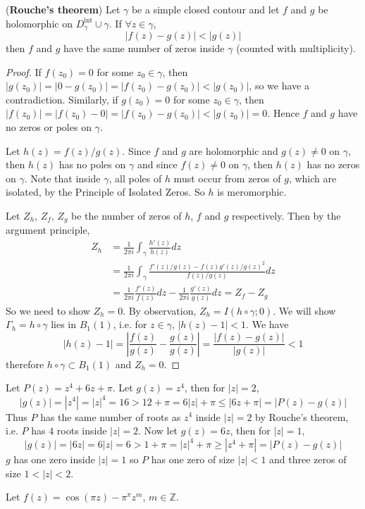 \begin{theorem}
	(\textbf{Rouche's theorem}) Let $\gamma$ be a simple closed contour and let $f$ and $g$ be holomorphic on $D_{\gamma}^{\text{int}} \cup \gamma$. If $\forall z \in \gamma$,
	\[
		|f(z) - g(z)| < |g(z)|
	\]
	then $f$ and $g$ have the same number of zeros inside $\gamma$ (counted with multiplicity).
\end{theorem}

\begin{proof}
	If $f(z_0) = 0$ for some $z_0 \in \gamma$, then $|g(z_0)| = |0 - g(z_0)| = |f(z_0) - g(z_0)| < |g(z_0)|$, so we have a contradiction. Similarly, if $g(z_0) = 0$ for some $z_0 \in \gamma$, then $|f(z_0)| = |f(z_0) - 0| = |f(z_0) - g(z_0)| < |g(z_0)| = 0$. Hence $f$ and $g$ have no zeros or poles on $\gamma$.

	Let $h(z) = f(z) / g(z)$. Since $f$ and $g$ are holomorphic and $g(z) \ne 0$ on $\gamma$, then $h(z)$ has no poles on $\gamma$ and since $f(z) \ne 0$ on $\gamma$, then $h(z)$ has no zeros on $\gamma$. Note that inside $\gamma$, all poles of $h$ must occur from zeros of $g$, which are isolated, by the Principle of Isolated Zeros. So $h$ is meromorphic.

	Let $Z_h$, $Z_f$, $Z_g$ be the number of zeros of $h$, $f$ and $g$ respectively. Then by the argument principle,
	\[
		\begin{aligned}
			Z_h & = \frac{1}{2\pi i} \int_{\gamma} \frac{h'(z)}{h(z)} dz \\
			& = \frac{1}{2\pi i} \int_{\gamma} \frac{f'(z) / g(z) - f(z) g'(z) / g(z)^2}{f(z) / g(z)} dz \\
			& = \frac{1}{2 \pi i} \frac{f'(z)}{f(z)} dz - \frac{1}{2 \pi i} \frac{g'(z)}{g(z)} dz = Z_f - Z_g
		\end{aligned}
	\]
	So we need to show $Z_h = 0$. By observation, $Z_h = I(h \circ \gamma; 0)$. We will show $\Gamma_h = h \circ \gamma$ lies in $B_1(1)$, i.e. for $z \in \gamma$, $|h(z) - 1| < 1$. We have
	\[
		|h(z) - 1| = \left| \frac{f(z)}{g(z)} - \frac{g(z)}{g(z)} \right| = \frac{|f(z) - g(z)|}{|g(z)|} < 1
	\]
	therefore $h \circ \gamma \subset B_1(1)$ and $Z_h = 0$.
\end{proof}

\begin{example}
	Let $P(z) = z^4 + 6z + \pi$. Let $g(z) = z^4$, then for $|z| = 2$,
	\[
		|g(z)| = |z^4| = |z|^4 = 16 > 12 + \pi = 6|z| + \pi \le |6z + \pi| = |P(z) - g(z)|
	\]
	Thus $P$ has the same number of roots as $z^4$ inside $|z| = 2$ by Rouche's theorem, i.e. $P$ has $4$ roots inside $|z| = 2$. Now let $g(z) = 6z$, then for $|z| = 1$,
	\[
		|g(z)| = |6z| = 6|z| = 6 > 1 + \pi = |z|^4 + \pi \ge |z^4 + \pi| = |P(z) - g(z)|
	\]
	$g$ has one zero inside $|z| = 1$ so $P$ has one zero  of size $|z| < 1$ and three zeros of size $1 < |z| < 2$.
\end{example}

\begin{example}
	Let $f(z) = \cos(\pi z) - \pi^{\pi} z^m$, $m \in \mathbb{Z}$.
\end{example}

